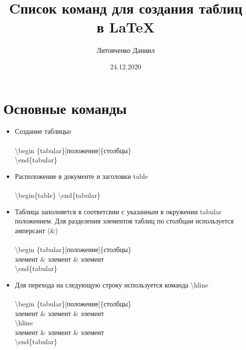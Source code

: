 \documentclass[a4paper,12pt]{article} %
\author{Литовченко Даниил}
\title{Cписок команд для создания таблиц в \LaTeX{}}
\date{24.12.2020}
\begin{document}

\maketitle
\newpage

\section{Основные команды}

\begin{itemize}
    \item Создание таблицыr\\\\
    \textbackslash begin \{tabular\}[положение]\{столбцы\}\\ \textbackslash end\{tabular\}
    \item Расположение в документе и заголовки table\\\\
    \textbackslash begin\{table\} \textbackslash end\{tabular\}
    \item Таблица заполняется в соответсвии с указанным в окружении tabular положением. Для разделения элементов таблиц по столбцам используется амперсант (\&)\\\\
    \textbackslash begin \{tabular\}[положение]\{столбцы\}\\
    элемент \& элемент \& элемент\\
    \textbackslash end\{tabular\}
    \item Для перехода на следующую строку используется команда \textbackslash hline \\\\
    \textbackslash begin \{tabular\}[положение]\{столбцы\}\\
    элемент \& элемент \& элемент\\
    \textbackslash hline\\
    элемент \& элемент \& элемент\\
    \textbackslash end\{tabular\}
    
\end{itemize}
\end{document}
